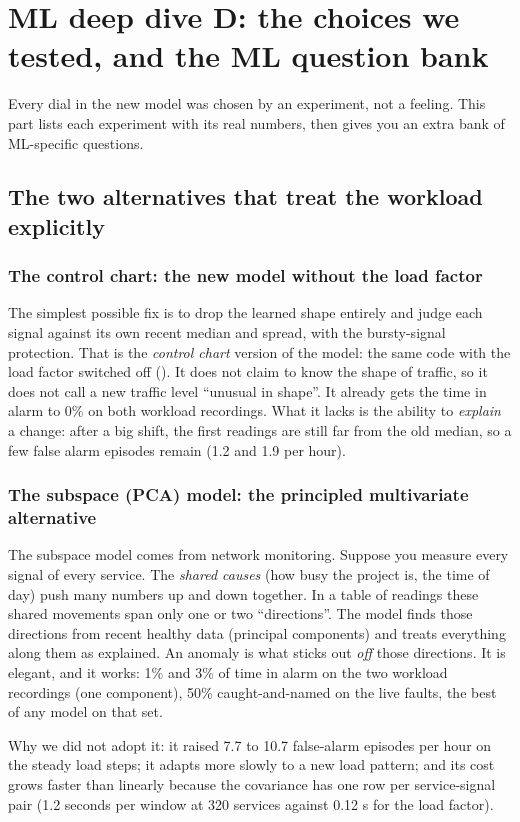 \chapter{ML deep dive D: the choices we tested, and the ML question bank}
\label{ch:deepeval}

Every dial in the new model was chosen by an experiment, not a feeling. This part lists each experiment with its real numbers, then gives you an extra bank of ML-specific questions.

\section{The two alternatives that treat the workload explicitly}

\subsection{The control chart: the new model without the load factor}
\begin{simplebox}
The simplest possible fix is to drop the learned shape entirely and judge each signal against its own recent median and spread, with the bursty-signal protection. That is the \emph{control chart} version of the model: the same code with the load factor switched off (). It does not claim to know the shape of traffic, so it does not call a new traffic level ``unusual in shape''. It already gets the time in alarm to 0\% on both workload recordings. What it lacks is the ability to \emph{explain} a change: after a big shift, the first readings are still far from the old median, so a few false alarm episodes remain (1.2 and 1.9 per hour).
\end{simplebox}

\subsection{The subspace (PCA) model: the principled multivariate alternative}
\begin{simplebox}
The subspace model comes from network monitoring. Suppose you measure every signal of every service. The \emph{shared causes} (how busy the project is, the time of day) push many numbers up and down together. In a table of readings these shared movements span only one or two ``directions''. The model finds those directions from recent healthy data (principal components) and treats everything along them as explained. An anomaly is what sticks out \emph{off} those directions. It is elegant, and it works: 1\% and 3\% of time in alarm on the two workload recordings (one component), 50\% caught-and-named on the live faults, the best of any model on that set.

Why we did not adopt it: it raised 7.7 to 10.7 false-alarm episodes per hour on the steady load steps; it adapts more slowly to a new load pattern; and its cost grows faster than linearly because the covariance has one row per service-signal pair (1.2 seconds per window at 320 services against 0.12 s for the load factor).
\end{simplebox}

